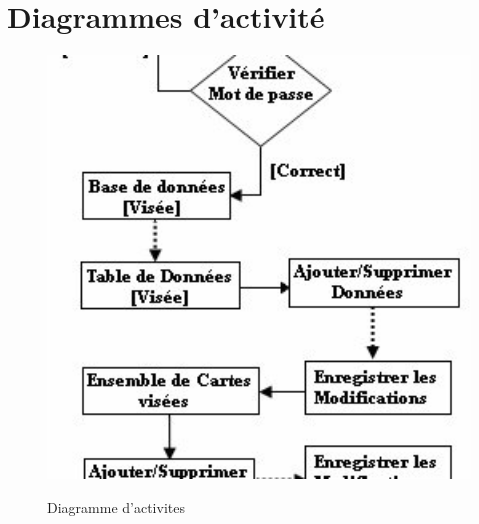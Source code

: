 \section{Diagrammes d'activité}
\lipsum[1]

\begin{figure}[t]
    \centering
    \includegraphics[width=1\textwidth]{diagrammeActivite}
    \label{image-diagrammeActivite}
    \caption{Diagramme d'activites}
    \end{figure}
